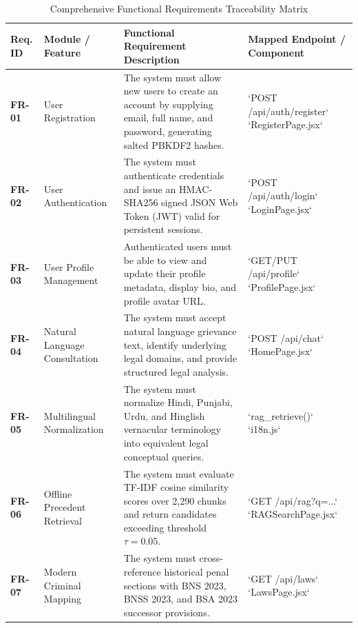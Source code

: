 \begin{table}[H]
\caption{Comprehensive Functional Requirements Traceability Matrix}
\label{tab:functional_requirements}
\centering
\small
\begin{tabularx}{\textwidth}{lp{3.5cm}Xp{2.8cm}}
\toprule
\textbf{Req. ID} & \textbf{Module / Feature} & \textbf{Functional Requirement Description} & \textbf{Mapped Endpoint / Component} \\
\midrule
\textbf{FR-01} & User Registration & The system must allow new users to create an account by supplying email, full name, and password, generating salted PBKDF2 hashes. & `POST /api/auth/register` \newline `RegisterPage.jsx` \\
\midrule
\textbf{FR-02} & User Authentication & The system must authenticate credentials and issue an HMAC-SHA256 signed JSON Web Token (JWT) valid for persistent sessions. & `POST /api/auth/login` \newline `LoginPage.jsx` \\
\midrule
\textbf{FR-03} & User Profile Management & Authenticated users must be able to view and update their profile metadata, display bio, and profile avatar URL. & `GET/PUT /api/profile` \newline `ProfilePage.jsx` \\
\midrule
\textbf{FR-04} & Natural Language Consultation & The system must accept natural language grievance text, identify underlying legal domains, and provide structured legal analysis. & `POST /api/chat` \newline `HomePage.jsx` \\
\midrule
\textbf{FR-05} & Multilingual Normalization & The system must normalize Hindi, Punjabi, Urdu, and Hinglish vernacular terminology into equivalent legal conceptual queries. & `rag_retrieve()` \newline `i18n.js` \\
\midrule
\textbf{FR-06} & Offline Precedent Retrieval & The system must evaluate TF-IDF cosine similarity scores over 2,290 chunks and return candidates exceeding threshold $\tau = 0.05$. & `GET /api/rag?q=...` \newline `RAGSearchPage.jsx` \\
\midrule
\textbf{FR-07} & Modern Criminal Mapping & The system must cross-reference historical penal sections with BNS 2023, BNSS 2023, and BSA 2023 successor provisions. & `GET /api/laws` \newline `LawsPage.jsx` \\

\end{tabularx}
\end{table}
